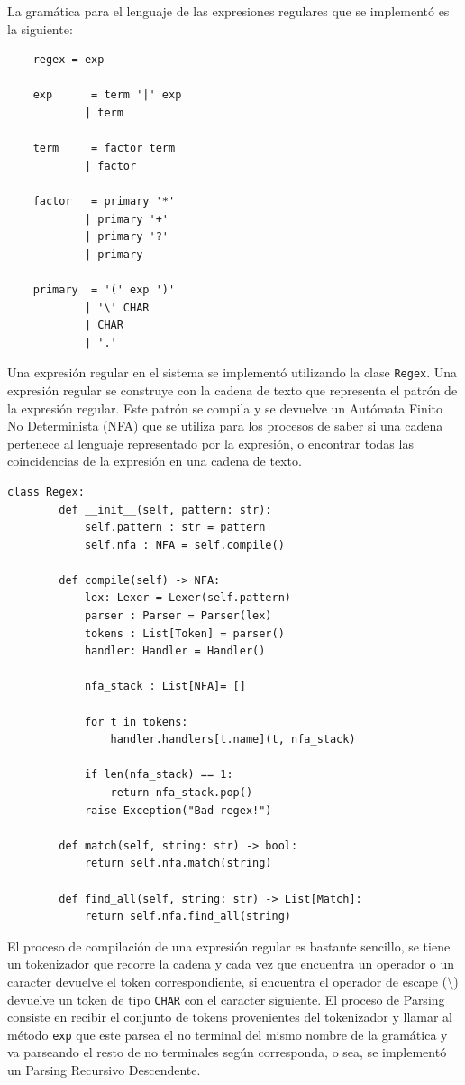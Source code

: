 La gramática para el lenguaje de las expresiones regulares que se implementó es la siguiente:

\begin{verbatim}
    regex = exp 

    exp      = term '|' exp    
            | term

    term     = factor term       
            | factor

    factor   = primary '*'      
            | primary '+'       
            | primary '?'       
            | primary

    primary  = '(' exp ')'
            | '\' CHAR              
            | CHAR
            | '.'
\end{verbatim}

Una expresión regular en el sistema se implementó utilizando la clase \verb|Regex|. Una expresión regular se construye con la cadena de texto que representa el patrón de la expresión regular. Este patrón se compila y se devuelve un Autómata Finito No Determinista (NFA) que se utiliza para los procesos de saber si una cadena pertenece al lenguaje representado por la expresión, o encontrar todas las coincidencias de la expresión en una cadena de texto. 

\begin{verbatim}
class Regex:
        def __init__(self, pattern: str):
            self.pattern : str = pattern
            self.nfa : NFA = self.compile()
    
        def compile(self) -> NFA:
            lex: Lexer = Lexer(self.pattern)
            parser : Parser = Parser(lex)
            tokens : List[Token] = parser()
            handler: Handler = Handler()
            
            nfa_stack : List[NFA]= []
            
            for t in tokens:
                handler.handlers[t.name](t, nfa_stack)
            
            if len(nfa_stack) == 1:
                return nfa_stack.pop() 
            raise Exception("Bad regex!")
    
        def match(self, string: str) -> bool:
            return self.nfa.match(string)
    
        def find_all(self, string: str) -> List[Match]:
            return self.nfa.find_all(string)
\end{verbatim}

El proceso de compilación de una expresión regular es bastante sencillo, se tiene un tokenizador que recorre la cadena y cada vez que encuentra un operador o un caracter devuelve el token correspondiente, si encuentra el operador de escape ($\setminus$) devuelve un token de tipo \verb|CHAR| con el caracter siguiente. El proceso de Parsing consiste en recibir el conjunto de tokens provenientes del tokenizador y llamar al método \verb|exp| que este parsea el no terminal del mismo nombre de la gramática y va parseando el resto de no terminales según corresponda, o sea, se implementó un Parsing Recursivo Descendente.

